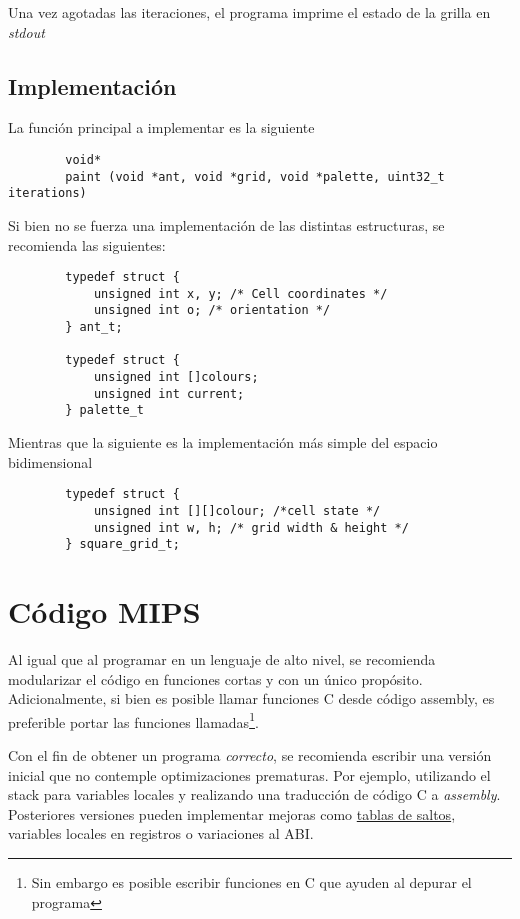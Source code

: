 \documentclass{article}
\begin{document}
Una vez agotadas las iteraciones, el programa imprime el estado de la grilla en \textit{stdout}

\subsection{Implementación}

La función principal a implementar es la siguiente
\begin{verbatim}
        void*
        paint (void *ant, void *grid, void *palette, uint32_t iterations)
\end{verbatim}

Si bien no se fuerza una implementación de las distintas estructuras, se recomienda las siguientes:

\begin{verbatim}
        typedef struct {
            unsigned int x, y; /* Cell coordinates */
            unsigned int o; /* orientation */
        } ant_t;

        typedef struct {
            unsigned int []colours;
            unsigned int current;
        } palette_t
\end{verbatim}

Mientras que la siguiente es la implementación más simple del espacio bidimensional
\begin{verbatim}
        typedef struct {
            unsigned int [][]colour; /*cell state */
            unsigned int w, h; /* grid width & height */
        } square_grid_t;
\end{verbatim}

\section{Código MIPS}
Al igual que al programar en un lenguaje de alto nivel, se recomienda modularizar el código en funciones
cortas y con un único propósito. Adicionalmente, si bien es posible llamar funciones C desde código assembly,
es preferible portar las funciones llamadas\footnote{Sin embargo es posible escribir funciones en C que ayuden
al depurar el programa}.

Con el fin de obtener un programa \textit{correcto}, se recomienda escribir una versión inicial que no contemple
optimizaciones prematuras. Por ejemplo, utilizando el stack para variables locales y realizando una traducción
de código C a \textit{assembly}. Posteriores versiones pueden implementar mejoras como \underline{tablas de saltos},
variables locales en registros o variaciones al ABI.
\end{document}
